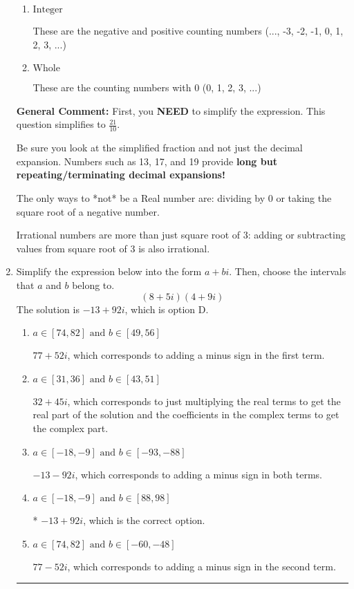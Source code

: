 \documentclass{extbook}[14pt]
\newcommand{\litem}[1]{\item #1

\rule{\textwidth}{0.4pt}}
\begin{document}
\begin{enumerate}
{\begin{enumerate}[label=\Alph*.]
These are Nonreal Complex numbers \textbf{OR} things that are not numbers (e.g., dividing by 0).
\item \( \text{Integer} \)

These are the negative and positive counting numbers (..., -3, -2, -1, 0, 1, 2, 3, ...)
\item \( \text{Whole} \)

These are the counting numbers with 0 (0, 1, 2, 3, ...)
\end{enumerate}

\textbf{General Comment:} First, you \textbf{NEED} to simplify the expression. This question simplifies to $\frac{21}{10}$. 
 
 Be sure you look at the simplified fraction and not just the decimal expansion. Numbers such as 13, 17, and 19 provide \textbf{long but repeating/terminating decimal expansions!} 
 
 The only ways to *not* be a Real number are: dividing by 0 or taking the square root of a negative number. 
 
 Irrational numbers are more than just square root of 3: adding or subtracting values from square root of 3 is also irrational.
}
\litem{
Simplify the expression below into the form $a+bi$. Then, choose the intervals that $a$ and $b$ belong to.
\[ (8 + 5 i)(4 + 9 i) \]The solution is \( -13 + 92 i \), which is option D.\begin{enumerate}[label=\Alph*.]
\item \( a \in [74, 82] \text{ and } b \in [49, 56] \)

 $77 + 52 i$, which corresponds to adding a minus sign in the first term.
\item \( a \in [31, 36] \text{ and } b \in [43, 51] \)

 $32 + 45 i$, which corresponds to just multiplying the real terms to get the real part of the solution and the coefficients in the complex terms to get the complex part.
\item \( a \in [-18, -9] \text{ and } b \in [-93, -88] \)

 $-13 - 92 i$, which corresponds to adding a minus sign in both terms.
\item \( a \in [-18, -9] \text{ and } b \in [88, 98] \)

* $-13 + 92 i$, which is the correct option.
\item \( a \in [74, 82] \text{ and } b \in [-60, -48] \)

 $77 - 52 i$, which corresponds to adding a minus sign in the second term.
\end{enumerate}

}
\end{enumerate}
\end{document}
